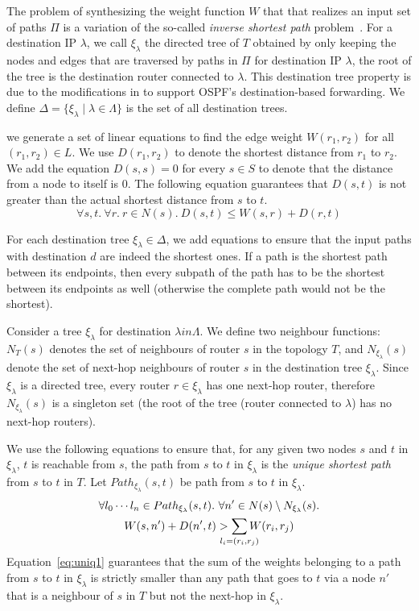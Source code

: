 The problem of synthesizing the weight function $W$ that
that realizes an input set of paths $\Pi$ is
a
variation of the so-called {\em inverse shortest path} 
problem~\cite{isp}. 
For a destination IP $\lambda$, we call $\xi_\lambda$ 
the directed tree of $T$ 
obtained by only keeping the nodes and edges 
that are traversed by paths in $\Pi$ for 
destination IP $\lambda$, the root of the tree
is the destination router connected to $\lambda$. 
 This destination tree
 property is due to the modifications in \genesis
 to support OSPF's destination-based forwarding. We
 define $\Delta=\{\xi_\lambda\mid \lambda \in \Lambda\}$ is   
the set of all destination trees. 


we generate a set of linear equations
to find the edge weight $W(r_1, r_2)$ 
for all $(r_1, r_2) \in L$.
We use 
$D(r_1, r_2)$ to denote the 
shortest distance from $r_1$ to $r_2$.
We add the equation $D(s,s) = 0$ 
for every $s\in S$ to denote that the distance
from a node to itself is $0$.
The
following equation guarantees that $D(s,t)$ is not greater than 
the actual shortest distance from $s$ to $t$.
\begin{equation} \label{eq:dist}
\forall s, t. ~\forall r. ~r \in N(s).~
D(s, t) \leq W(s, r) + D(r, t)
\end{equation}

For each destination tree $\xi_\lambda\in\Delta$, we add equations to ensure 
that the input paths with destination $d$ are indeed the shortest ones.
If a path
is the shortest path between its endpoints, then every 
subpath of the path has to be the shortest between its endpoints
as well (otherwise the complete path would not be the shortest).

Consider a tree $\xi_\lambda$ for destination $\lambda in \Lambda$. We define two neighbour
functions: $N_T(s)$ denotes the set of neighbours of router $s$ 
in the topology $T$, and $N_{\xi_\lambda}(s)$ denote the set of
next-hop neighbours of router $s$ in the destination tree $\xi_\lambda$.
Since $\xi_\lambda$ is a directed tree, every router $r \in \xi_\lambda$
has one next-hop router, therefore $N_{\xi_\lambda}(s)$ is a singleton
set (the root of the tree (router connected to $\lambda$) has no next-hop
routers).

We use the following equations to ensure that, for any 
given two nodes $s$ and $t$ in
$\xi_\lambda$, $t$ is reachable from $s$, 
the path from $s$ to $t$ in $\xi_\lambda$ is the 
\emph{unique shortest path} from $s$ to $t$ in $T$.
Let $Path_{\xi_\lambda}(s,t)$ be path from $s$ to $t$ in $\xi_\lambda$.
\begin{multline} \label{eq:uniq1}
\forall l_0\cdots l_n\in Path_{\xi_\lambda}(s,t).
~\forall n' \in N(s) \setminus N_{\xi_\lambda}(s). \\
W(s, n') + D(n', t) > \sum_{\mathclap{\substack{l_i=(r_i,r_j)}}} 
W(r_i, r_j) 
\end{multline}
Equation~\ref{eq:uniq1} guarantees that 
the sum of the weights belonging to a path from $s$ to $t$ in $\xi_\lambda$ 
is strictly smaller than 
any path that goes to $t$ via 
a node $n'$ that is a neighbour of $s$ in $T$ but not 
the next-hop in $\xi_\lambda$.

